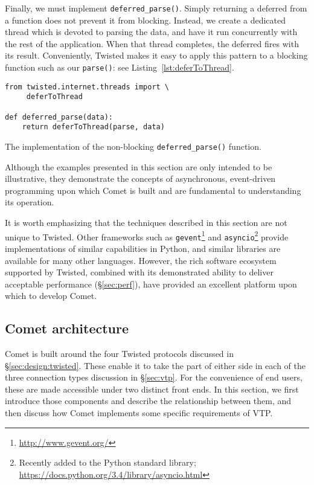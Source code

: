 \documentclass[5p,authoryear]{elsarticle}
\begin{document}
Finally, we must implement \texttt{deferred\_parse()}.  Simply returning a
deferred from a function does not prevent it from blocking.  Instead, we
create a dedicated thread which is devoted to parsing the data, and have it
run concurrently with the rest of the application. When that thread completes,
the deferred fires with its result. Conveniently, Twisted makes it easy to
apply this pattern to a blocking function such as our \texttt{parse()}: see
Listing~\ref{lst:deferToThread}.

\begin{listing}
\begin{verbatim}
from twisted.internet.threads import \
     deferToThread

def deferred_parse(data):
    return deferToThread(parse, data)
\end{verbatim}
\caption{The implementation of the non-blocking \texttt{deferred\_parse()} function.}
\label{lst:deferToThread}
\end{listing}

Although the examples presented in this section are only intended to be
illustrative, they demonstrate the concepts of asynchronous, event-driven
programming upon which Comet is built and are fundamental to understanding its
operation.

It is worth emphasizing that the techniques described in this section are not
unique to Twisted. Other frameworks such as
\texttt{gevent}\footnote{\url{http://www.gevent.org/}} and
\texttt{asyncio}\footnote{Recently added to the Python standard
library; \url{https://docs.python.org/3.4/library/asyncio.html}} provide
implementations of similar capabilities in Python, and similar libraries are
available for many other languages. However, the rich software ecosystem
supported by Twisted, combined with its demonstrated ability to deliver
acceptable performance (\S\ref{sec:perf}), have provided an excellent
platform upon which to develop Comet.

\subsection{Comet architecture}
\label{sec:design:architecture}

Comet is built around the four Twisted protocols discussed in
\S\ref{sec:design:twisted}. These enable it to take the part of either side in
each of the three connection types discussion in \S\ref{sec:vtp}. For the
convenience of end users, these are made accessible under two distinct front
ends. In this section, we first introduce those components and describe the
relationship between them, and then discuss how Comet implements some specific
requirements of VTP.
\end{document}
